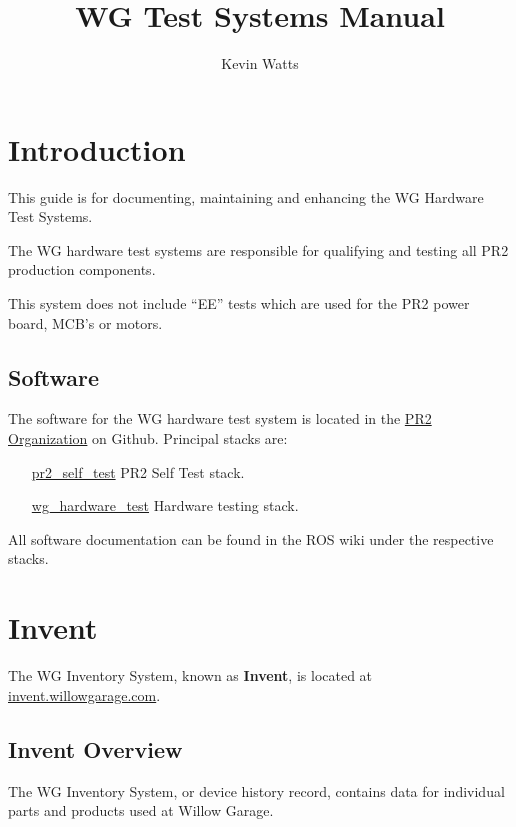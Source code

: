 \documentclass[11pt]{report}
\begin{document}
\title{WG Test Systems Manual}
\author{Kevin Watts}
\newcommand{\TODO}[1]{\textcolor{red}{TODO: #1}}
\maketitle

\tableofcontents
\newpage


\chapter {Introduction}

This guide is for documenting, maintaining and enhancing the WG Hardware Test Systems. 

The WG hardware test systems are responsible for qualifying and testing all PR2 production components.

This system does not include ``EE'' tests which are used for the PR2 power board, MCB's or motors.


\section {Software}

The software for the WG hardware test system is located in the \href{https://github.com/PR2}{PR2 Organization} on Github. Principal stacks are:
\begin{itemize}
\item [\href{https://github.com/PR2/pr2_self_test}{pr2\_self\_test}] PR2 Self Test stack.
\item [\href{https://github.com/willowgarage/wg_hardware_test}{wg\_hardware\_test}] Hardware testing stack.
\end{itemize}

All software documentation can be found in the ROS wiki under the respective stacks.

\chapter {Invent}

The WG Inventory System, known as {\bf Invent}, is located at \href{http://invent.willowgarage.com}{invent.willowgarage.com}. 

\section{Invent Overview}
The WG Inventory System, or device history record, contains data for individual parts and products used at Willow Garage. 
\end{document}
